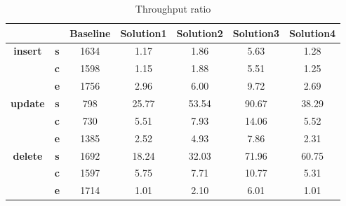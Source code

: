 \begin{table}[h]
\newcommand{\B}[1]{\colorbox{light-gray}{#1}}
 \centering
\caption{Throughput ratio}\label{t:}
\begin{tabular}{ccccccc}
\toprule
&&\textbf{Baseline} & \textbf{Solution1} & \textbf{Solution2} & \textbf{Solution3} & \textbf{Solution4}\\
\midrule
\multirow{3}{*}{\textbf{insert}} & \textbf{s} & 1634 & 1.17 & 1.86 & 5.63 & 1.28\\
 & \textbf{c} & 1598 & 1.15 & 1.88 & 5.51 & 1.25\\
 & \textbf{e} & 1756 & 2.96 & 6.00 & 9.72 & 2.69\\
\midrule
\multirow{3}{*}{\textbf{update}} & \textbf{s} & 798 & 25.77 & 53.54 & 90.67 & 38.29\\
 & \textbf{c} & 730 & 5.51 & 7.93 & 14.06 & 5.52\\
 & \textbf{e} & 1385 & 2.52 & 4.93 & 7.86 & 2.31\\
\midrule
\multirow{3}{*}{\textbf{delete}} & \textbf{s} & 1692 & 18.24 & 32.03 & 71.96 & 60.75\\
 & \textbf{c} & 1597 & 5.75 & 7.71 & 10.77 & 5.31\\
 & \textbf{e} & 1714 & 1.01 & 2.10 & 6.01 & 1.01\\
\bottomrule
\end{tabular}
\end{table}






